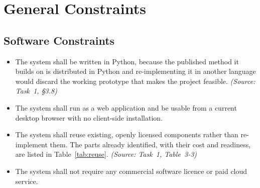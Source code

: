 \documentclass[12pt,a4paper]{report}
\newcommand{\src}[1]{{\small\itshape (Source: #1)}}
\begin{document}
\chapter{General Constraints}
\label{ch:constraints}

\section{Software Constraints}
\label{sec:software-constraints}

\begin{itemize}
  \setlength{\itemsep}{0pt}
  \setlength{\parsep}{0pt}
  \item The system shall be written in Python, because the published method
    it builds on is distributed in Python and re-implementing it in another
    language would discard the working prototype that makes the project
    feasible. \src{Task~1, \S3.8}
  \item The system shall run as a web application and be usable from a
    current desktop browser with no client-side installation.
  \item The system shall reuse existing, openly licensed components rather
    than re-implement them. The parts already identified, with their cost
    and readiness, are listed in Table~\ref{tab:reuse}.
    \src{Task~1, Table~3-3}
  \item The system shall not require any commercial software licence or
    paid cloud service.
\end{itemize}
\end{document}
